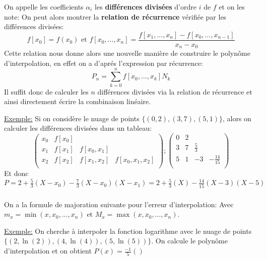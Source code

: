 On appelle les coefficients \(\alpha_i\) les \textbf{différences divisées} d'ordre \(i\) de \(f\) et on les note:
On peut alors montrer la \textbf{relation de récurrence} vérifiée par les différences divisées:
\[
   f[x_0] = f(x_0) \text{ et } f[x_0, \ldots, x_n] = \frac{f[x_1, \ldots, x_n] - f[x_0, \ldots, x_{n-1}]}{x_n-x_0}   
\]
Cette relation nous donne alors une nouvelle manière de construire le polynôme d'interpolation, en effet on a d'aprés l'expression par récurrence:
\[
   P_n = \sum_{k=0}^{n} f[x_0, \ldots, x_k] N_k   
\]
Il suffit donc de calculer les \(n\) différences divisées via la relation de récurrence et ainsi directement écrire la combinaison linéaire.\<

\underline{Exemple:} Si on considère le nuage de points \(\{(0, 2), (3, 7), (5, 1)\}\), alors on calculer les différences divisées dans un tableau:
\[
   \left(\begin{array}{cccc}
      x_0 & f[x_0] &  & \\ 
      x_1 & f[x_1] & f[x_0, x_1] &\\
      x_2 & f[x_2] & f[x_1, x_2] & f[x_0, x_1, x_2]\\ 
   \end{array}\right)  ; 
   \left(\begin{array}{cccc}
      0 & 2 &  & \\ 
      3 & 7 & \frac{5}{3} &\\
      5 & 1 & -3 & -\frac{14}{15}\\ 
   \end{array}\right)
\] 
Et donc \(P = 2 + \frac{5}{3}(X - x_0) -  \frac{7}{3}(X - x_0)(X - x_1) = 2 + \frac{5}{3}(X) -  \frac{14}{15}(X - 3)(X - 5)\)
\subsection*{}
On a la formule de majoration suivante pour l'erreur d'interpolation:
Avec \(m_x = \min(x, x_0, \ldots, x_n)\) et \(M_x = \max(x, x_0, \ldots, x_n)\).\<

\underline{Exemple:} On cherche à interpoler la fonction logarithme avec le nuage de points \(\{(2, \ln(2)), (4, \ln(4)), (5, \ln(5))\}\). 
On calcule le polynôme d'interpolation et on obtient \(P(x) = \frac{-1}{5}()\)
\chapter*{}

